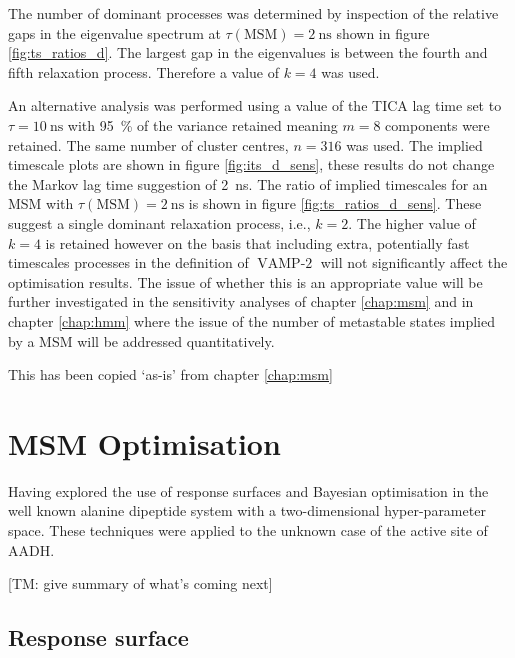 The number of dominant processes was determined by inspection of the relative gaps in the eigenvalue spectrum at $\tau(\mathrm{MSM})=\SI{2}{\nano\second}$ shown in figure \ref{fig:ts_ratios_d}. The largest gap in the eigenvalues is between the fourth and fifth relaxation process. Therefore a value of $k=4$ was used. 

An alternative analysis was performed using a value of the TICA lag time set to $\tau=\SI{10}{\nano\second}$ with \SI{95}{\percent} of the variance retained meaning $m=8$ components were retained. The same number of cluster centres, $n=316$ was used. The implied timescale plots are shown in figure \ref{fig:its_d_sens}, these results do not change the Markov lag time suggestion of \SI{2}{\nano\second}. The ratio of implied timescales for an MSM with $\tau(\textrm{MSM})=\SI{2}{\nano\second}$ is shown in figure \ref{fig:ts_ratios_d_sens}. These suggest a single dominant relaxation process, i.e., $k=2$. The higher value of $k=4$ is retained however on the basis that including extra, potentially fast timescales processes in the definition of $\operatorname{VAMP-2}$ will not significantly affect the optimisation results. The issue of whether this is an appropriate value will be further investigated in the sensitivity analyses of chapter \ref{chap:msm} and in chapter \ref{chap:hmm} where the issue of the number of metastable states implied by a MSM will be addressed quantitatively. 

{\huge This has been copied `as-is' from chapter \ref{chap:msm}}
\section{MSM Optimisation}\label{subsec:aadh}

Having explored the use of response surfaces and Bayesian optimisation in the well known alanine dipeptide system with a two-dimensional hyper-parameter space. These techniques were applied to the unknown case of the active site of AADH. 

[TM: give summary of what's coming next]

\subsection{Response surface}\label{subsubsec:aadh_rsm}

